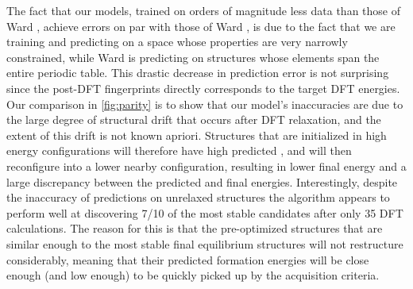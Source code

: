 The fact that our models,
trained on orders of magnitude less data than those of Ward ,
achieve errors on par with those of Ward ,
is due to the fact that we are training and predicting on a space whose properties are very narrowly constrained, while Ward  is predicting on structures whose elements span the entire periodic table.
%
This drastic decrease in prediction error is not surprising since the post-DFT fingerprints directly corresponds to the target DFT energies.
%
Our comparison in \ref{fig:parity} is to show that our model's inaccuracies are due to the large degree of structural drift that occurs after DFT relaxation, and the extent of this drift is not known apriori.
%
Structures that are initialized in high energy configurations will therefore have high predicted \DHf,
and will then reconfigure into a lower nearby configuration, resulting in lower final energy and a large discrepancy between the predicted and final energies.
%
Interestingly, despite the inaccuracy of predictions on unrelaxed structures the algorithm appears to perform well at discovering \num{7/10} of the most stable candidates after only \num{35} DFT calculations.
%
The reason for this is that the pre-optimized structures that are similar enough to the most stable final equilibrium structures will not restructure considerably, meaning that their predicted formation energies will be close enough (and low enough) to be quickly picked up by the acquisition criteria.


